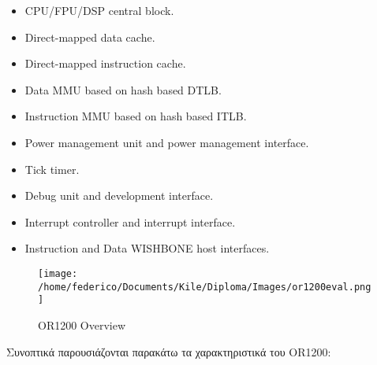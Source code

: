 \documentclass[a4paper,10pt]{article}
\begin{document}
{{\begin{itemize}
 \item CPU/FPU/DSP central block.
 \item Direct-mapped data cache.
 \item Direct-mapped instruction cache.
 \item Data MMU based on hash based DTLB.
 \item Instruction MMU based on hash based ITLB.
 \item Power management unit and power management interface.
 \item Tick timer.
 \item Debug unit and development interface.
 \item Interrupt controller and interrupt interface.
 \item Instruction and Data WISHBONE host interfaces.
\end{itemize}
\begin{figure}[h!]
 \centering
 \texttt{[image: /home/federico/Documents/Kile/Diploma/Images/or1200eval.png]}
 \caption{OR1200 Overview}
\end{figure}

Συνοπτικά παρουσιάζονται παρακάτω τα χαρακτηριστικά του OR1200:

}}
\end{document}
